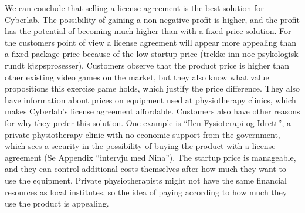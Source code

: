 We can conclude that selling a license agreement is the best solution for Cyberlab. The possibility of gaining a non-negative profit is higher, and the profit has the potential of becoming much higher than with a fixed price solution. For the customers point of view a license agreement will appear more appealing than a fixed package price because of the low startup price (trekke inn noe psykologisk rundt kj{ø}psprosesser). Customers observe that the product price is higher than other existing video games on the market, but they also know what value propositions this exercise game holds, which justify the price difference. They also have information about prices on equipment used at physiotherapy clinics, which makes Cyberlab’s license agreement affordable. Customers also have other reasons for why they prefer this solution. One example is “Ilen Fysioterapi og Idrett”, a private physiotherapy clinic with no economic support from the government, which sees a security in the possibility of buying the product with a license agreement (Se Appendix “intervju med Nina”). The startup price is manageable, and they can control additional costs themselves after how much they want to use the equipment. Private physiotherapists might not have the same financial resources as local institutes, so the idea of paying according to how much they use the product is appealing. 

